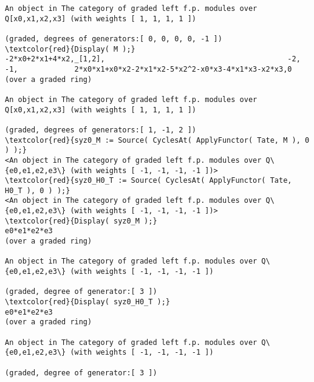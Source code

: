 \documentclass[16pt,a4paper]{extarticle}
\theoremstyle{definition}
\begin{document}
\begin{Verbatim}[commandchars=\\\{\}]
An object in The category of graded left f.p. modules over Q[x0,x1,x2,x3] (with weights [ 1, 1, 1, 1 ])

(graded, degrees of generators:[ 0, 0, 0, 0, -1 ])
\textcolor{red}{Display( M );}
-2*x0+2*x1+4*x2,_[1,2],                                          -2,
-1,             2*x0*x1+x0*x2-2*x1*x2-5*x2^2-x0*x3-4*x1*x3-x2*x3,0  
(over a graded ring)

An object in The category of graded left f.p. modules over Q[x0,x1,x2,x3] (with weights [ 1, 1, 1, 1 ])

(graded, degrees of generators:[ 1, -1, 2 ])
\textcolor{red}{syz0_M := Source( CyclesAt( ApplyFunctor( Tate, M ), 0 ) );}
<An object in The category of graded left f.p. modules over Q\{e0,e1,e2,e3\} (with weights [ -1, -1, -1, -1 ])>
\textcolor{red}{syz0_H0_T := Source( CyclesAt( ApplyFunctor( Tate, H0_T ), 0 ) );}
<An object in The category of graded left f.p. modules over Q\{e0,e1,e2,e3\} (with weights [ -1, -1, -1, -1 ])>
\textcolor{red}{Display( syz0_M );}
e0*e1*e2*e3
(over a graded ring)

An object in The category of graded left f.p. modules over Q\{e0,e1,e2,e3\} (with weights [ -1, -1, -1, -1 ])

(graded, degree of generator:[ 3 ])
\textcolor{red}{Display( syz0_H0_T );}
e0*e1*e2*e3
(over a graded ring)

An object in The category of graded left f.p. modules over Q\{e0,e1,e2,e3\} (with weights [ -1, -1, -1, -1 ])

(graded, degree of generator:[ 3 ])
\end{Verbatim}
\end{document}
